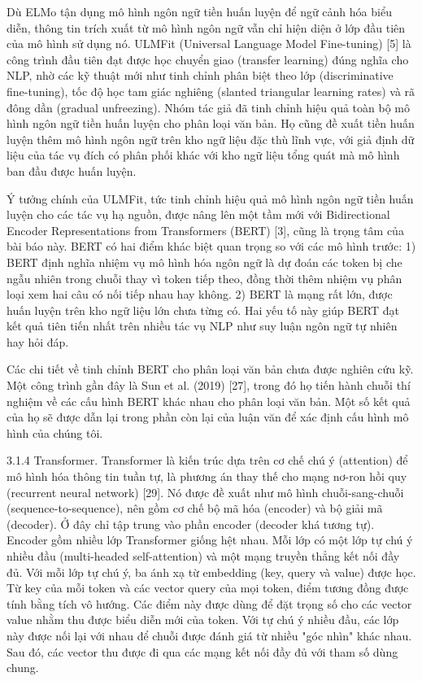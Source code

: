 Dù ELMo tận dụng mô hình ngôn ngữ tiền huấn luyện để ngữ cảnh hóa biểu diễn, thông tin trích xuất từ mô hình ngôn ngữ vẫn chỉ hiện diện ở lớp đầu tiên của mô hình sử dụng nó. ULMFit (Universal Language Model Fine-tuning) {[}5{]} là công trình đầu tiên đạt được học chuyển giao (transfer learning) đúng nghĩa cho NLP, nhờ các kỹ thuật mới như tinh chỉnh phân biệt theo lớp (discriminative fine-tuning), tốc độ học tam giác nghiêng (slanted triangular learning rates) và rã đông dần (gradual unfreezing). Nhóm tác giả đã tinh chỉnh hiệu quả toàn bộ mô hình ngôn ngữ tiền huấn luyện cho phân loại văn bản. Họ cũng đề xuất tiền huấn luyện thêm mô hình ngôn ngữ trên kho ngữ liệu đặc thù lĩnh vực, với giả định dữ liệu của tác vụ đích có phân phối khác với kho ngữ liệu tổng quát mà mô hình ban đầu được huấn luyện.

Ý tưởng chính của ULMFit, tức tinh chỉnh hiệu quả mô hình ngôn ngữ tiền huấn luyện cho các tác vụ hạ nguồn, được nâng lên một tầm mới với Bidirectional Encoder Representations from Transformers (BERT) {[}3{]}, cũng là trọng tâm của bài báo này. BERT có hai điểm khác biệt quan trọng so với các mô hình trước: 1) BERT định nghĩa nhiệm vụ mô hình hóa ngôn ngữ là dự đoán các token bị che ngẫu nhiên trong chuỗi thay vì token tiếp theo, đồng thời thêm nhiệm vụ phân loại xem hai câu có nối tiếp nhau hay không. 2) BERT là mạng rất lớn, được huấn luyện trên kho ngữ liệu lớn chưa từng có. Hai yếu tố này giúp BERT đạt kết quả tiên tiến nhất trên nhiều tác vụ NLP như suy luận ngôn ngữ tự nhiên hay hỏi đáp.

Các chi tiết về tinh chỉnh BERT cho phân loại văn bản chưa được nghiên cứu kỹ. Một công trình gần đây là Sun et al. (2019) {[}27{]}, trong đó họ tiến hành chuỗi thí nghiệm về các cấu hình BERT khác nhau cho phân loại văn bản. Một số kết quả của họ sẽ được dẫn lại trong phần còn lại của luận văn để xác định cấu hình mô hình của chúng tôi.

3.1.4 Transformer. Transformer là kiến trúc dựa trên cơ chế chú ý (attention) để mô hình hóa thông tin tuần tự, là phương án thay thế cho mạng nơ-ron hồi quy (recurrent neural network) {[}29{]}. Nó được đề xuất như mô hình chuỗi-sang-chuỗi (sequence-to-sequence), nên gồm cơ chế bộ mã hóa (encoder) và bộ giải mã (decoder). Ở đây chỉ tập trung vào phần encoder (decoder khá tương tự). Encoder gồm nhiều lớp Transformer giống hệt nhau. Mỗi lớp có một lớp tự chú ý nhiều đầu (multi-headed self-attention) và một mạng truyền thẳng kết nối đầy đủ. Với mỗi lớp tự chú ý, ba ánh xạ từ embedding (key, query và value) được học. Từ key của mỗi token và các vector query của mọi token, điểm tương đồng được tính bằng tích vô hướng. Các điểm này được dùng để đặt trọng số cho các vector value nhằm thu được biểu diễn mới của token. Với tự chú ý nhiều đầu, các lớp này được nối lại với nhau để chuỗi được đánh giá từ nhiều "góc nhìn" khác nhau. Sau đó, các vector thu được đi qua các mạng kết nối đầy đủ với tham số dùng chung.

